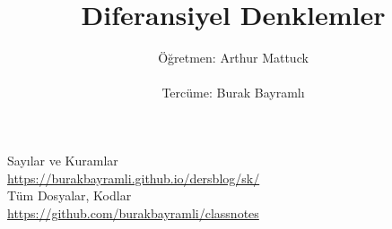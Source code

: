 \documentclass[12pt,a4paper]{report}
\title{Diferansiyel Denklemler}
\author{Öğretmen: Arthur Mattuck \\ \\ Tercüme: Burak Bayramlı}
\date{}
\begin{document}
\maketitle

\newpage


\begin{figure}[!hbp]
\end{figure}

\vspace*{4cm}
\begin{center}
\vspace{0.5cm}
Sayılar ve Kuramlar\\
\vspace{0.5cm}
\url{https://burakbayramli.github.io/dersblog/sk/}\\
\vspace{0.5cm}
Tüm Dosyalar, Kodlar\\
\vspace{0.5cm}
\url{https://github.com/burakbayramli/classnotes}\\
\end{center}
\end{document}
